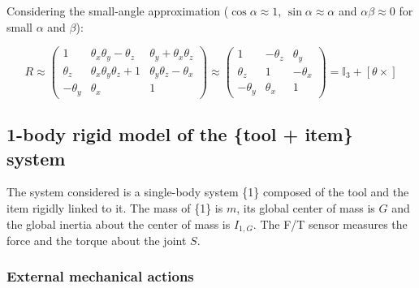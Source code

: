 \documentclass[a4paper, 11pt]{article}
\begin{document}
Considering the small-angle approximation ($\cos \alpha \approx 1$, $\sin \alpha \approx \alpha$ and $\alpha \beta \approx 0$ for small $\alpha$ and $\beta$):

\begin{equation}
 R \approx
 \begin{pmatrix}
  1         & \theta_x \theta_y -\theta_z    & \theta_y + \theta_x \theta_z \\
  \theta_z  & \theta_x \theta_y \theta_z + 1 & \theta_y \theta_z -\theta_x  \\
  -\theta_y & \theta_x                       & 1
 \end{pmatrix}
 \approx
 \begin{pmatrix}
  1         & -\theta_z & \theta_y  \\
  \theta_z  & 1         & -\theta_x \\
  -\theta_y & \theta_x  & 1
 \end{pmatrix}
 = \mathbb{I}_3 + \left[ \theta \times \right]
\end{equation}

\newpage

\subsection{1-body rigid model of the \{tool + item\} system}

The system considered is a single-body system \{1\} composed of the tool and the item rigidly linked to it. The mass of \{1\} is $m$, its global center of mass is $G$ and the global inertia about the center of mass is $I_{1, G}$. The F/T sensor measures the force and the torque about the joint $S$.

\subsubsection{External mechanical actions}
\end{document}
